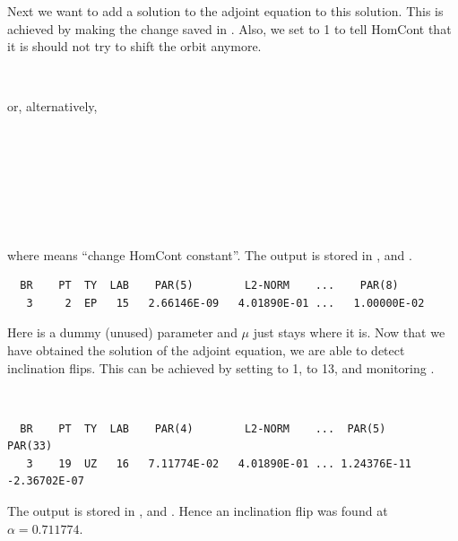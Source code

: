 \documentclass[12pt]{report}
\begin{document}
Next we want to add a solution to the adjoint equation to this
solution. This is achieved by making the change 
saved in . Also, we set  to 1 to tell 
{\cal HomCont} that it is should not try to shift the orbit anymore.
\begin{center}
 \\
\end{center}
or, alternatively,
\begin{center}
\\
\\
\\
\\
\\
\\
\end{center}
where  means ``change {\cal HomCont} constant''.
The output is stored in ,   and .
\begin{verbatim}
  BR    PT  TY  LAB    PAR(5)        L2-NORM    ...    PAR(8)     
   3     2  EP   15   2.66146E-09   4.01890E-01 ...   1.00000E-02
\end{verbatim}
Here  is a dummy (unused) parameter and $\mu$ just stays where
it is. Now that we have obtained the solution of the adjoint equation,
we are able to detect inclination flips. This can be achieved by
setting  to 1,  to 13, and monitoring .
\begin{center}
 \\
\end{center} 
\begin{verbatim}
  BR    PT  TY  LAB    PAR(4)        L2-NORM    ...  PAR(5)        PAR(33)
   3    19  UZ   16   7.11774E-02   4.01890E-01 ... 1.24376E-11  -2.36702E-07
\end{verbatim}   
The output is stored in ,   and .
Hence an inclination flip was found at $\alpha=0.711774$.
\end{document}
